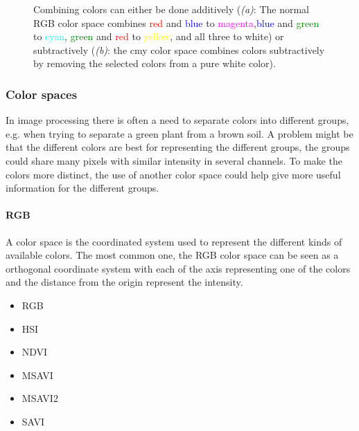 \begin{figure}[H]
    \centering
    \captionsetup[subfigure]{justification=centering}
    \begin{subfigure}[b]{0.49\textwidth}
        \centering
		\caption{}
		\label{fig:color_additive}
    \end{subfigure}
    \begin{subfigure}[b]{0.49\textwidth}
        \centering
		\caption{}
		\label{fig:color_subtractive}
    \end{subfigure}
    \caption{Combining colors can either be done additively  (\textit{(a)}: The normal RGB color space combines \textcolor{red}{red} and \textcolor{blue}{blue} to \textcolor{magenta}{magenta},\textcolor{blue}{blue} and \textcolor{green}{green} to \textcolor{cyan}{cyan}, \textcolor{green}{green} and \textcolor{red}{red} to \textcolor{yellow}{yellow}, and all three to white) or subtractively (\textit{(b)}: the cmy color space combines colors subtractively by removing the selected colors from a pure white color).}
    \label{fig:color_arithmetic}
\end{figure}

\subsubsection{Color spaces}

In image processing there is often a need to separate colors into different groups, e.g. when trying to separate a green plant from a brown soil. A problem might be that the different colors are best for representing the different groups, the groups could share many pixels with similar intensity in several channels. To make the colors more distinct, the use of another color space could help give more useful information for the different groups.

\paragraph{RGB}

A color space is the coordinated system used to represent the different kinds of available colors. The most common one, the RGB color space can be seen as a orthogonal coordinate system with each of the axis representing one of the colors and the distance from the origin represent the intensity.

\begin{itemize}
\item RGB
\item HSI
\item NDVI
\item MSAVI
\item MSAVI2
\item SAVI
\end{itemize}

